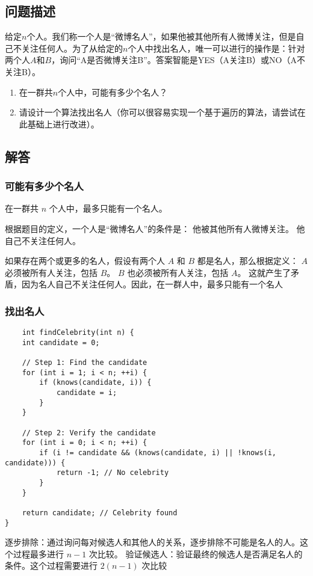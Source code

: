 \documentclass{article}
\begin{document}
\subsection{问题描述}

给定$n$个人。我们称一个人是“微博名人”，如果他被其他所有人微博关注，但是自己不关注任何人。为了从给定的$n$个人中找出名人，唯一可以进行的操作是：针对两个人$A$和$B$，询问“A是否微博关注B”。答案智能是YES（A关注B）或NO（A不关注B）。

\begin{enumerate}
    \item 在一群共$n$个人中，可能有多少个名人？
    \item 请设计一个算法找出名人（你可以很容易实现一个基于遍历的算法，请尝试在此基础上进行改进）。
\end{enumerate}

\subsection{解答}
\subsubsection{可能有多少个名人}
在一群共 $n$ 个人中，最多只能有一个名人。

根据题目的定义，一个人是“微博名人”的条件是：
他被其他所有人微博关注。
他自己不关注任何人。

如果存在两个或更多的名人，假设有两个人 $A$ 和 $B$ 都是名人，那么根据定义：
$A$ 必须被所有人关注，包括 $B$。
$B$ 也必须被所有人关注，包括 $A$。
这就产生了矛盾，因为名人自己不关注任何人。因此，在一群人中，最多只能有一个名人
\subsubsection{找出名人}
\begin{lstlisting}
    int findCelebrity(int n) {
    int candidate = 0;

    // Step 1: Find the candidate
    for (int i = 1; i < n; ++i) {
        if (knows(candidate, i)) {
            candidate = i;
        }
    }

    // Step 2: Verify the candidate
    for (int i = 0; i < n; ++i) {
        if (i != candidate && (knows(candidate, i) || !knows(i, candidate))) {
            return -1; // No celebrity
        }
    }

    return candidate; // Celebrity found
}
\end{lstlisting}
逐步排除：通过询问每对候选人和其他人的关系，逐步排除不可能是名人的人。这个过程最多进行 $n-1$ 次比较。
验证候选人：验证最终的候选人是否满足名人的条件。这个过程需要进行 $2(n-1)$ 次比较
\end{document}
